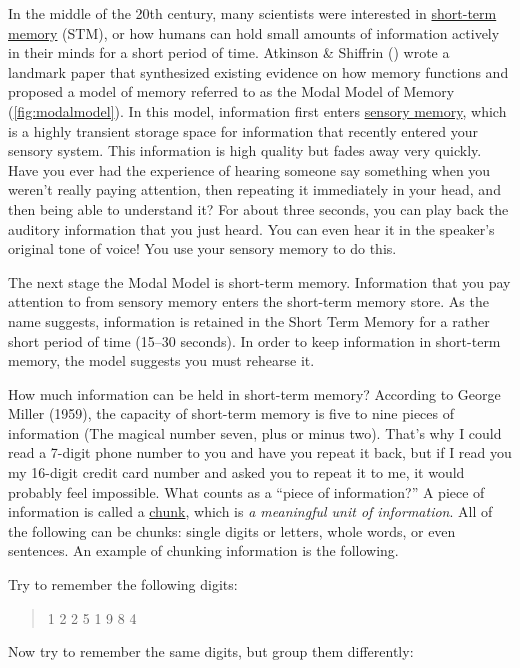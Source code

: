 \documentclass[
]{krantz}
\begin{document}
In the middle of the 20th century, many scientists were interested in \hyperref[short-term-memory]{short-term memory} (STM), or how humans can hold small amounts of information actively in their minds for a short period of time. Atkinson \& Shiffrin () wrote a landmark paper that synthesized existing evidence on how memory functions and proposed a model of memory referred to as the Modal Model of Memory (\ref{fig:modalmodel}). In this model, information first enters \hyperref[sensory-memory]{sensory memory}, which is a highly transient storage space for information that recently entered your sensory system. This information is high quality but fades away very quickly. Have you ever had the experience of hearing someone say something when you weren't really paying attention, then repeating it immediately in your head, and then being able to understand it? For about three seconds, you can play back the auditory information that you just heard. You can even hear it in the speaker's original tone of voice! You use your sensory memory to do this.

The next stage the Modal Model is short-term memory. Information that you pay attention to from sensory memory enters the short-term memory store. As the name suggests, information is retained in the Short Term Memory for a rather short period of time (15--30 seconds). In order to keep information in short-term memory, the model suggests you must rehearse it.

How much information can be held in short-term memory? According to George Miller (1959), the capacity of short-term memory is five to nine pieces of information (The magical number seven, plus or minus two). That's why I could read a 7-digit phone number to you and have you repeat it back, but if I read you my 16-digit credit card number and asked you to repeat it to me, it would probably feel impossible. What counts as a ``piece of information?'' A piece of information is called a \hyperref[chunk]{chunk}, which is \emph{a meaningful unit of information}. All of the following can be chunks: single digits or letters, whole words, or even sentences. An example of chunking information is the following.

Try to remember the following digits:

\begin{quote}
1 2 2 5 1 9 8 4
\end{quote}

Now try to remember the same digits, but group them differently:
\end{document}
